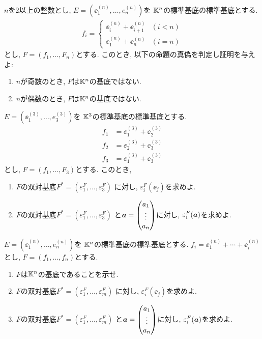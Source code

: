\begin{quiz}
  $n$を$2$以上の整数とし,
  $E=(\ee^{(n)}_1,\ldots,e^{(n)}_n)$を
  $\mathbb{K}^n$の標準基底の標準基底とする.
  \begin{align*}
    f_i =
    \begin{cases}
      \ee^{(n)}_i+\ee^{(n)}_{i+1} &(i<n)\\
      \ee^{(n)}_1+\ee^{(n)}_n&(i=n)
    \end{cases}
  \end{align*}
  とし,
  $F=(f_1,\ldots,F_n)$とする.
  このとき,
  以下の命題の真偽を判定し証明を与えよ:  
  \begin{enumerate}
    \item $n$が奇数のとき, $F$は$\mathbb{K}^n$の基底ではない.
    \item $n$が偶数のとき, $F$は$\mathbb{K}^n$の基底ではない.
  \end{enumerate}
\end{quiz}

\begin{quiz}
  $E=(\ee^{(3)}_1,\ldots,e^{(3)}_3)$を
  $\mathbb{K}^3$の標準基底の標準基底とする.
  \begin{align*}
    f_1 &=\ee^{(3)}_1+\ee^{(3)}_2\\
    f_2 &=\ee^{(3)}_2+\ee^{(3)}_3\\
    f_3 &=\ee^{(3)}_1+\ee^{(3)}_3
  \end{align*}
  とし, $F=(f_1,\ldots,F_3)$とする.
  このとき,
   \begin{enumerate}
    \item $F$の双対基底$F^\ast=(\varepsilon_1^{F},\ldots,\varepsilon_3^{F})$
      に対し, $\varepsilon_i^{F}(\ee_j)$を求めよ.
    \item $F$の双対基底$F^\ast=(\varepsilon_1^{F},\ldots,\varepsilon_3^{F})$
      と$\boldsymbol{a}=\begin{pmatrix}a_1\\\vdots\\a_n\end{pmatrix}$に対し,
      $\varepsilon_i^{F}(\boldsymbol{a})$を求めよ.
   \end{enumerate}
\end{quiz}

\begin{quiz}
  $E=(\ee^{(n)}_1,\ldots,e^{(n)}_n)$を
  $\mathbb{K}^n$の標準基底の標準基底とする.
  $f_i=\ee^{(n)}_1+\cdots+\ee^{(n)}_i$とし,
  $F=(f_1,\ldots,f_n)$とする.
  \begin{enumerate}
    \item $F$は$\mathbb{K}^n$の基底であることを示せ.
    \item $F$の双対基底$F^\ast=(\varepsilon_1^{F},\ldots,\varepsilon_m^{F})$
      に対し, $\varepsilon_i^{F}(\ee_j)$を求めよ.
    \item $F$の双対基底$F^\ast=(\varepsilon_1^{F},\ldots,\varepsilon_m^{F})$
      と$\boldsymbol{a}=\begin{pmatrix}a_1\\\vdots\\a_n\end{pmatrix}$に対し,
      $\varepsilon_i^{F}(\boldsymbol{a})$を求めよ.
  \end{enumerate}
\end{quiz}

